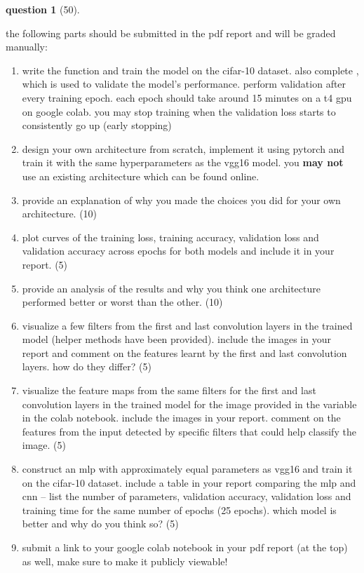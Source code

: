 \documentclass[12pt]{article}
\theoremstyle{definition}
\newtheorem{exercise}{question}%
\begin{document}
\begin{exercise}[50]
{\begin{enumerate}[label=(\theexercise.\arabic*)]
\end{enumerate}
the following parts should be submitted in the pdf report and will be graded manually:
\begin{enumerate}[start=3]
    \item write the  function and train the model on the cifar-10 dataset. also complete , which is used to validate the model's performance. perform validation after every training epoch. each epoch should take around 15 minutes on a t4 gpu on google colab. you may stop training when the validation loss starts to consistently go up (early stopping)
    \item design your own architecture from scratch, implement it using pytorch and train it with the same hyperparameters as the vgg16 model. you \textbf{may not} use an existing architecture which can be found online.
    \item provide an explanation of why you made the choices you did for your own architecture. (10)
    \item plot curves of the training loss, training accuracy, validation loss and validation accuracy across epochs for both models and include it in your report.  (5)
    \item provide an analysis of the results and why you think one architecture performed better or worst than the other. (10)
    \item visualize a few filters from the first and last convolution layers in the trained model (helper methods have been provided). include the images in your report and comment on the features learnt by the first and last convolution layers. how do they differ? (5)
    \item visualize the feature maps from the same filters for the first and last convolution layers in the trained model for the image provided in the variable  in the colab notebook. include the images in your report. comment on the features from the input detected by specific filters that could help classify the image. (5)
    \item construct an mlp with approximately equal parameters as  vgg16 and train it on the cifar-10 dataset. include a table in your report comparing the mlp and cnn -- list the number of parameters, validation accuracy, validation loss and training time for the same number of epochs (25 epochs). which model is better and why do you think so? (5)
    \item submit a link to your google colab notebook in your pdf report (at the top) as well, make sure to make it publicly viewable!
\end{enumerate}
}
\vspace{1em}

\end{exercise}
\end{document}
